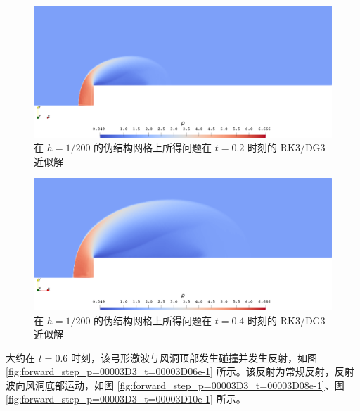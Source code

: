 \begin{figure}[h!]
\begin{centering}
\includegraphics[width=1\textwidth,height=0.28\textheight]{../mdpi/figures/forward_step/p=3_t=02e-1}
\par\end{centering}
\caption{\label{fig:forward_step_p=00003D3_t=00003D02e-1}在 $h=1/200$ 的伪结构网格上所得问题在
$t=0.2$ 时刻的 RK3/DG3 近似解}
\end{figure}

\begin{figure}[h!]
\begin{centering}
\includegraphics[width=1\textwidth,height=0.28\textheight]{../mdpi/figures/forward_step/p=3_t=04e-1}
\par\end{centering}
\caption{\label{fig:forward_step_p=00003D3_t=00003D04e-1}在 $h=1/200$ 的伪结构网格上所得问题在
$t=0.4$ 时刻的 RK3/DG3 近似解}
\end{figure}

大约在 $t=0.6$ 时刻，该弓形激波与风洞顶部发生碰撞并发生反射，如图 \ref{fig:forward_step_p=00003D3_t=00003D06e-1}
所示。该反射为常规反射，反射波向风洞底部运动，如图 \ref{fig:forward_step_p=00003D3_t=00003D08e-1}、图
\ref{fig:forward_step_p=00003D3_t=00003D10e-1} 所示。

